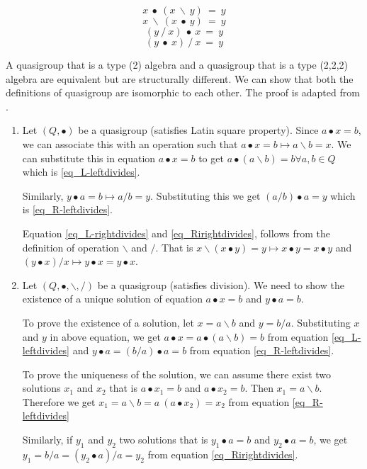 \begin{equation} \label{eq_L-leftdivides}
  x\ ∙\ (x\ \backslash\ y) \ = \ y
\end{equation}
\begin{equation} \label{eq_L-rightdivides}
  x\ \backslash\ (x\ ∙\ y)\ = \ y
\end{equation}
\begin{equation} \label{eq_R-leftdivides}
  (y\ /\ x)\ ∙\ x \ =\ y
\end{equation}
\begin{equation} \label{eq_Rirightdivides}
  (y\ ∙\ x)\ /\ x \ =\ y
\end{equation}

A quasigroup that is a type (2) algebra and a quasigroup that is a type (2,2,2)
algebra are equivalent but are structurally different. We can show that both the
definitions of quasigroup are isomorphic to each other. The proof is adapted
from \cite{shcherbacov2003elements}.

\begin{enumerate}
  \item 
Let $(Q, ∙)$ be a quasigroup (satisfies Latin square property). Since $ a ∙ x =
b$, we can associate this with an operation such that $a ∙ x = b \mapsto a
\backslash b = x$. We can substitute this in equation $a ∙ x = b$ to get $a ∙ (a
\backslash b) = b \forall a,b \in Q$ which is \ref{eq_L-leftdivides}.

Similarly, $y ∙ a = b \mapsto a / b = y$. Substituting this we get $ (a / b) ∙ a
= y$ which is \ref{eq_R-leftdivides}.

Equation \ref{eq_L-rightdivides} and \ref{eq_Rirightdivides}, follows from the
definition of operation $\backslash$ and $/$. That is $x \backslash (x ∙ y) = y \mapsto x
∙ y = x ∙ y$ and $(y ∙ x) /x \mapsto y ∙ x = y ∙ x$.

\item 
Let $(Q,∙, \backslash, /)$ be a quasigroup (satisfies division). We need to show
the existence of a unique solution of equation $ a ∙ x = b$ and $y ∙ a = b$.

To prove the existence of a solution, let $x = a\backslash b$ and $y = b / a$.
Substituting $x$ and $y$ in above equation, we get $a ∙ x = a ∙ (a \backslash b)
= b$ from equation \ref{eq_L-leftdivides} and $ y ∙ a = (b / a) ∙ a = b$ from
equation \ref{eq_R-leftdivides}.

To prove the uniqueness of the solution, we can assume there exist two
solutions $x_1$ and $x_2$ that is $a ∙ x_1 = b$ and $a ∙ x_2 = b$. Then $x_1 = a \backslash b$.
Therefore we get $x_1 = a \backslash b = a \ (a ∙ x_2) = x_2$ from equation \ref{eq_R-leftdivides}

Similarly, if $y_1$ and $y_2$ two solutions that is $y_1 ∙ a = b$ and $y_2 ∙ a = b$, we get 
$y_1 = b / a = (y_2 ∙ a) / a = y_2$ from equation \ref{eq_Rirightdivides}.

\end{enumerate}

